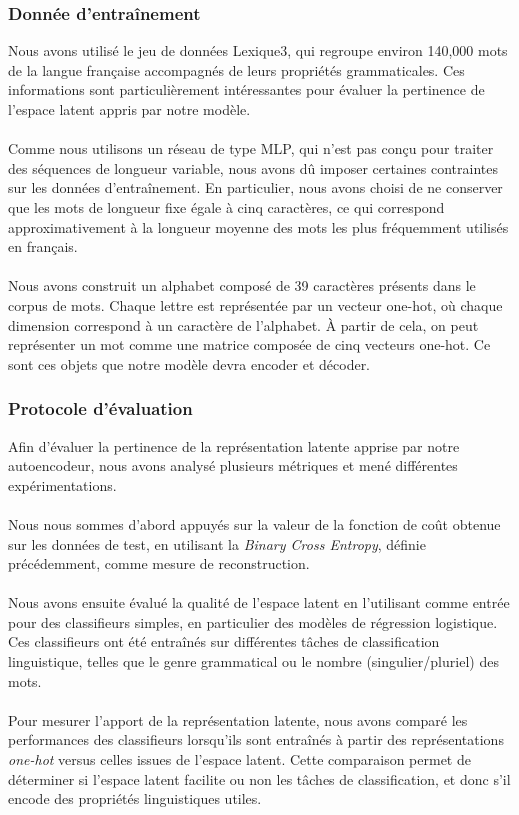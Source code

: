 \documentclass{article}
\begin{document}
\subsubsection{Donnée d'entraînement}

Nous avons utilisé le jeu de données Lexique3, qui regroupe environ 140,000 mots de la langue française accompagnés de leurs propriétés grammaticales. Ces informations sont particulièrement intéressantes pour évaluer la pertinence de l’espace latent appris par notre modèle.
\\ \\
Comme nous utilisons un réseau de type MLP, qui n’est pas conçu pour traiter des séquences de longueur variable, nous avons dû imposer certaines contraintes sur les données d’entraînement. En particulier, nous avons choisi de ne conserver que les mots de longueur fixe égale à cinq caractères, ce qui correspond approximativement à la longueur moyenne des mots les plus fréquemment utilisés en français.
\\ \\
Nous avons construit un alphabet composé de 39 caractères présents dans le corpus de mots. Chaque lettre est représentée par un vecteur one-hot, où chaque dimension correspond à un caractère de l’alphabet. À partir de cela, on peut représenter un mot comme une matrice composée de cinq vecteurs one-hot. Ce sont ces objets que notre modèle devra encoder et décoder.

\subsubsection{Protocole d'évaluation}

Afin d’évaluer la pertinence de la représentation latente apprise par notre autoencodeur, nous avons analysé plusieurs métriques et mené différentes expérimentations.
\\ \\
Nous nous sommes d’abord appuyés sur la valeur de la fonction de coût obtenue sur les données de test, en utilisant la \textit{Binary Cross Entropy}, définie précédemment, comme mesure de reconstruction.
\\ \\
Nous avons ensuite évalué la qualité de l’espace latent en l’utilisant comme entrée pour des classifieurs simples, en particulier des modèles de régression logistique. Ces classifieurs ont été entraînés sur différentes tâches de classification linguistique, telles que le genre grammatical ou le nombre (singulier/pluriel) des mots.
\\ \\
Pour mesurer l’apport de la représentation latente, nous avons comparé les performances des classifieurs lorsqu’ils sont entraînés à partir des représentations \textit{one-hot} versus celles issues de l’espace latent. Cette comparaison permet de déterminer si l’espace latent facilite ou non les tâches de classification, et donc s’il encode des propriétés linguistiques utiles.
\end{document}
